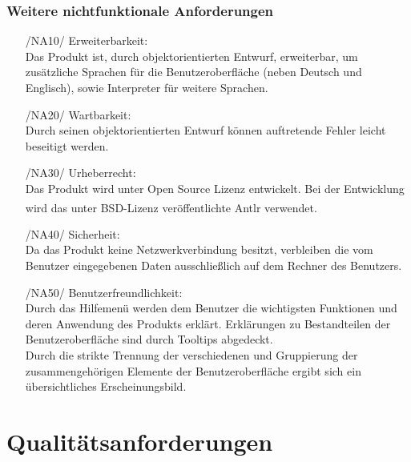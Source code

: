 \documentclass[parskip=full]{scrartcl}
\begin{document}
		\subsubsection{Weitere nichtfunktionale Anforderungen}
		\begin{itemize}
		\item[/NA10/]Erweiterbarkeit: \\
		Das Produkt ist, durch objektorientierten Entwurf, erweiterbar, um zusätzliche Sprachen für die Benutzeroberfläche (neben Deutsch und Englisch), sowie \gls{Interpreter} für weitere Sprachen.
		\item[/NA20/]Wartbarkeit: \\
		Durch seinen objektorientierten Entwurf können auftretende Fehler leicht beseitigt werden.
		\item[/NA30/]Urheberrecht: \\
		Das Produkt wird unter Open Source Lizenz entwickelt. Bei der Entwicklung wird das unter BSD-Lizenz veröffentlichte Antlr\textsuperscript{\textcopyright} verwendet.
		\item[/NA40/] Sicherheit: \\
		Da das Produkt keine Netzwerkverbindung besitzt, verbleiben die vom Benutzer eingegebenen Daten ausschließlich auf dem Rechner des Benutzers.
		\item[/NA50/]Benutzerfreundlichkeit: \\
		Durch das Hilfemenü werden dem Benutzer die wichtigsten Funktionen und deren Anwendung des Produkts erklärt. Erklärungen zu Bestandteilen der Benutzeroberfläche sind durch \glspl{Tooltip} abgedeckt. \\
		Durch die strikte Trennung der verschiedenen und Gruppierung der zusammengehörigen Elemente der Benutzeroberfläche ergibt sich ein übersichtliches Erscheinungsbild. 
		\end{itemize}
		

\section{Qualitätsanforderungen}
\end{document}
